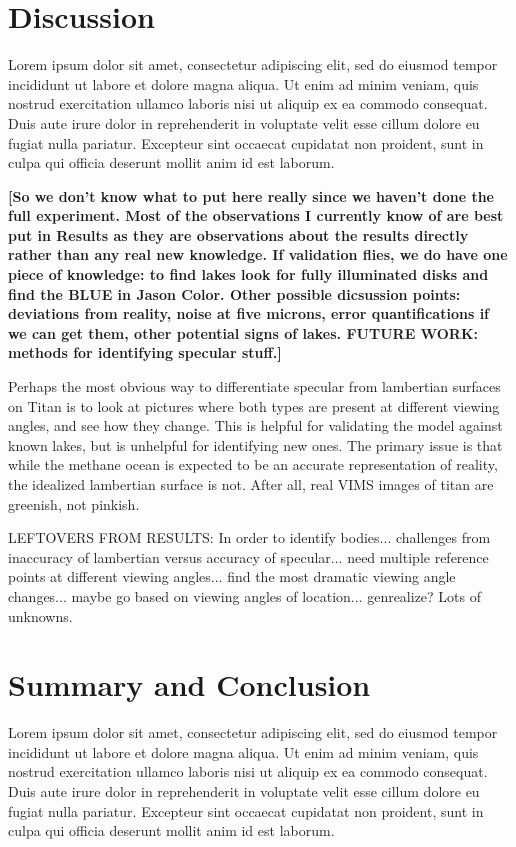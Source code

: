 \documentclass[twocolumn,linenumbers]{aastex631}
\begin{document}
\section{Discussion} \label{sec:discussion}

Lorem ipsum dolor sit amet, consectetur adipiscing elit, sed do eiusmod tempor incididunt ut labore et dolore magna aliqua. Ut enim ad minim veniam, quis nostrud exercitation ullamco laboris nisi ut aliquip ex ea commodo consequat. Duis aute irure dolor in reprehenderit in voluptate velit esse cillum dolore eu fugiat nulla pariatur. Excepteur sint occaecat cupidatat non proident, sunt in culpa qui officia deserunt mollit anim id est laborum.

\textbf{\color{red}[So we don't know what to put here really since we haven't done the full experiment. Most of the observations I currently know of are best put in Results as they are observations about the results directly rather than any real new knowledge. If validation flies, we do have one piece of knowledge: to find lakes look for fully illuminated disks and find the BLUE in Jason Color. Other possible dicsussion points: deviations from reality, noise at five microns, error quantifications if we can get them, other potential signs of lakes. FUTURE WORK: methods for identifying specular stuff.]
\color{black}}

Perhaps the most obvious way to differentiate specular from lambertian surfaces on Titan is to look at pictures where both types are present at different viewing angles, and see how they change. This is helpful for validating the model against known lakes, but is unhelpful for identifying new ones. The primary issue is that while the methane ocean is expected to be an accurate representation of reality, the idealized lambertian surface is not. After all, real VIMS images of titan are greenish, not pinkish. 

\color{blue} LEFTOVERS FROM RESULTS: In order to identify bodies... challenges from inaccuracy of lambertian versus accuracy of specular... need multiple reference points at different viewing angles... find the most dramatic viewing angle changes... maybe go based on viewing angles of location... genrealize? Lots of unknowns. \color{black}

\section{Summary and Conclusion} \label{sec:conclusion}

Lorem ipsum dolor sit amet, consectetur adipiscing elit, sed do eiusmod tempor incididunt ut labore et dolore magna aliqua. Ut enim ad minim veniam, quis nostrud exercitation ullamco laboris nisi ut aliquip ex ea commodo consequat. Duis aute irure dolor in reprehenderit in voluptate velit esse cillum dolore eu fugiat nulla pariatur. Excepteur sint occaecat cupidatat non proident, sunt in culpa qui officia deserunt mollit anim id est laborum. 
\end{document}
